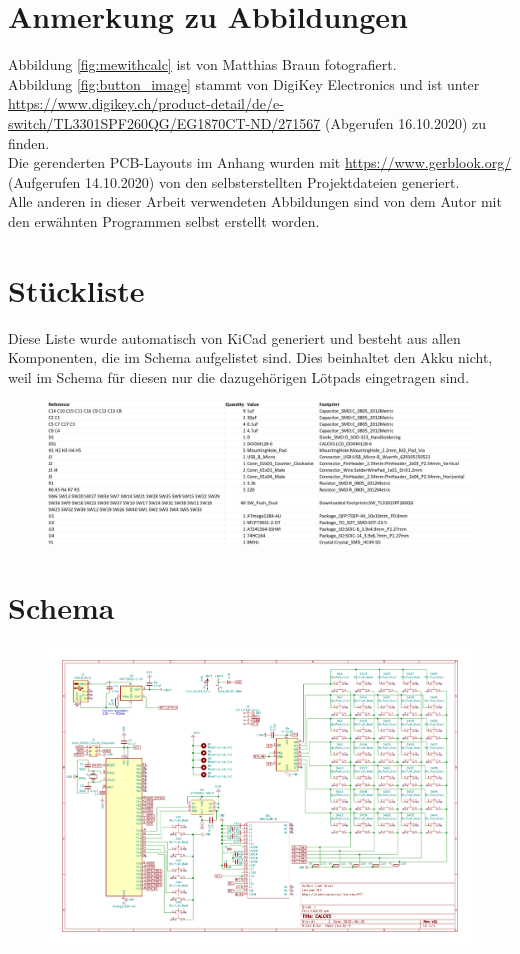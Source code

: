 \documentclass[12pt, a4paper]{report}
\begin{document}
\section{Anmerkung zu Abbildungen}
Abbildung \ref{fig:mewithcalc} ist von Matthias Braun fotografiert.\\
Abbildung \ref{fig:button_image} stammt von DigiKey Electronics und ist unter \url{https://www.digikey.ch/product-detail/de/e-switch/TL3301SPF260QG/EG1870CT-ND/271567} (Abgerufen 16.10.2020) zu finden.\\
Die gerenderten PCB-Layouts im Anhang wurden mit \url{https://www.gerblook.org/} (Aufgerufen 14.10.2020) von den selbsterstellten Projektdateien generiert.\\
Alle anderen in dieser Arbeit verwendeten Abbildungen sind von dem Autor mit den erwähnten Programmen selbst erstellt worden.

\begin{landscape}
\section{Stückliste}
Diese Liste wurde automatisch von KiCad generiert und besteht aus allen Komponenten, die im Schema aufgelistet sind. Dies beinhaltet den Akku nicht, weil im Schema für diesen nur die dazugehörigen Lötpads eingetragen sind.
\begin{figure}[h]
\includegraphics[width=\linewidth]{assets/bom.png}
\end{figure}
\newpage
\section{Schema}
\begin{figure}[H]
\includegraphics[height=\textheight]{assets/schematic.pdf}
\end{figure}
\end{landscape}
\end{document}
